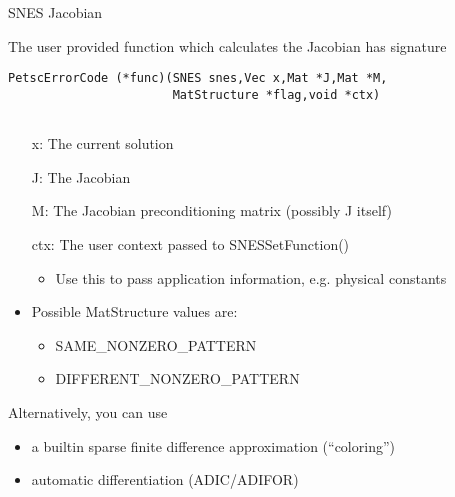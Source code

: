 \begin{frame}[fragile]{SNES Jacobian}

The user provided function which calculates the Jacobian has signature
\begin{center}\small

\begin{verbatim}
PetscErrorCode (*func)(SNES snes,Vec x,Mat *J,Mat *M,
                       MatStructure *flag,void *ctx)
                     
\end{verbatim}

\end{center}
\begin{itemize}
  \item[{\kb x}:] The current solution
  \item[{\kb J}:] The Jacobian
  \item[{\kb M}:] The Jacobian preconditioning matrix (possibly J itself)
  \item[{\kb ctx}:] The user context passed to {\kb SNESSetFunction()}
  \begin{itemize}
    \item Use this to pass application information, e.g. physical constants
  \end{itemize}

  \item Possible {\kb MatStructure} values are:
  \begin{itemize}
    \item SAME\_NONZERO\_PATTERN
    \item DIFFERENT\_NONZERO\_PATTERN
  \end{itemize}
\end{itemize}

Alternatively, you can use
\begin{itemize}
  \item a builtin sparse finite difference approximation (``coloring'')
  \item automatic differentiation (ADIC/ADIFOR)
\end{itemize}

\end{frame}
